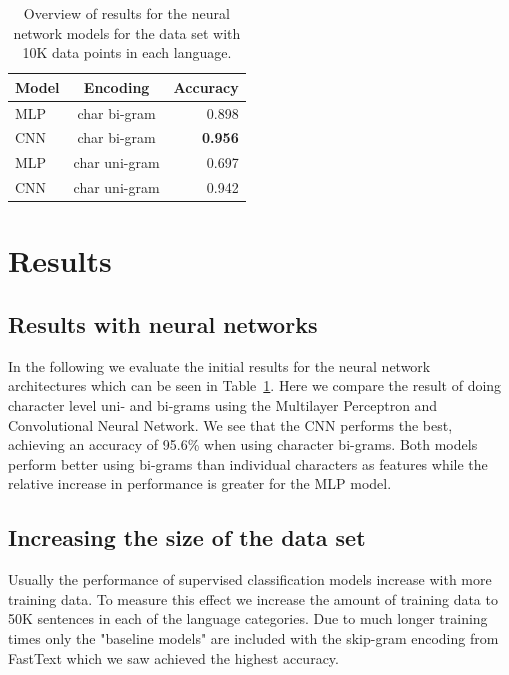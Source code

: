 
\begin{table}
  \centering
  \begin{tabular}{ l | c | r }
    \hline
    Model               & Encoding  & Accuracy \\
    \hline
    MLP                 & char bi-gram &  0.898 \\
    CNN                 & char bi-gram & \textbf{0.956} \\
    MLP                 & char uni-gram &  0.697\\
    CNN                 & char uni-gram  & 0.942 \\
    \hline
  \end{tabular}
  \caption{Overview of results for the neural network models for the data set with 10K data points in each language.}
  \label{keras-results}
\end{table}

\section{Results}

\subsection{Results with neural networks}
In the following we evaluate the initial results for the neural network architectures which can be seen in Table~\ref{keras-results}. Here we compare the result of doing character level uni- and bi-grams using the Multilayer Perceptron and Convolutional Neural Network. We see that the CNN performs the best, achieving an accuracy of 95.6\% when using character bi-grams. Both models perform better using bi-grams than individual characters as features while the relative increase in performance is greater for the MLP model.\\


\subsection{Increasing the size of the data set}
Usually the performance of supervised classification models increase with more training data. To measure this effect we increase the amount of training data to 50K sentences in each of the language categories. Due to much longer training times only the "baseline models" are included with the skip-gram encoding from FastText which we saw achieved the highest accuracy.\\ 

